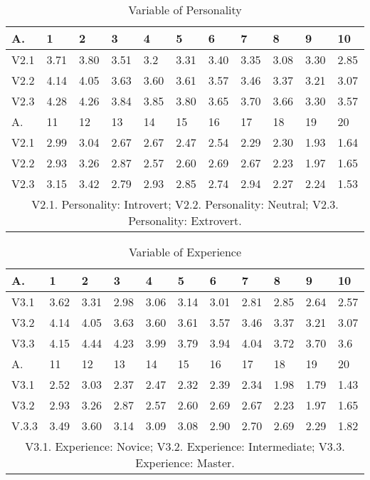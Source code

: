 \documentclass[english]{textolivre}
\begin{document}
\begin{table}[htpb]
\caption{Variable of Personality}
\label{figure4}
\centering
\begin{tabular}{lllllllllll}
\toprule
A. & 1 & 2 & 3 & 4 & 5 & 6 & 7 & 8 & 9 & 10
\\ 
\midrule
V2.1 & 3.71 & 3.80 & 3.51 & 3.2 & 3.31 & 3.40 & 3.35 & 3.08 & 3.30 & 2.85
\\
V2.2 & 4.14 & 4.05 & 3.63 & 3.60 & 3.61 & 3.57 & 3.46 & 3.37 & 3.21 & 3.07
\\
V2.3 & 4.28 & 4.26 & 3.84 & 3.85 & 3.80 & 3.65 & 3.70 & 3.66 & 3.30 & 3.57
\\
\midrule
A. & 11 & 12 & 13 & 14 & 15 & 16 & 17 & 18 & 19 & 20
\\
\midrule
V2.1 & 2.99 & 3.04 & 2.67 & 2.67 & 2.47 & 2.54 & 2.29 & 2.30 & 1.93 & 1.64
\\
V2.2 & 2.93 & 3.26 & 2.87 & 2.57 & 2.60 & 2.69 & 2.67 & 2.23 & 1.97 & 1.65
\\
V2.3 & 3.15 & 3.42 & 2.79 & 2.93 & 2.85 & 2.74 & 2.94 & 2.27 & 2.24 & 1.53
\\ 
\midrule
\multicolumn{11}{c}{V2.1. Personality: Introvert; V2.2. Personality: Neutral; V2.3. Personality: Extrovert.}
\\
\bottomrule
\end{tabular}
\centering
\end{table}

\begin{table}[htpb]
\caption{Variable of Experience}
\label{figure5}
\centering
\begin{tabular}{lllllllllll}
\toprule
A. & 1 & 2 & 3 & 4 & 5 & 6 & 7 & 8 & 9 & 10
\\ 
\midrule
V3.1 & 3.62 & 3.31 & 2.98 & 3.06 & 3.14 & 3.01 & 2.81 & 2.85 & 2.64 & 2.57 
\\
V3.2 & 4.14 & 4.05 & 3.63 & 3.60 & 3.61 & 3.57 & 3.46 & 3.37 & 3.21 & 3.07
\\
V3.3 & 4.15 & 4.44 & 4.23 & 3.99 & 3.79 & 3.94 & 4.04 & 3.72 & 3.70 & 3.6
\\
\midrule
A. & 11 & 12 & 13 & 14 & 15 & 16 & 17 & 18 & 19 & 20
\\
\midrule
V3.1 & 2.52 & 3.03 & 2.37 & 2.47 & 2.32 & 2.39 & 2.34 & 1.98 & 1.79 & 1.43
\\
V3.2 & 2.93 & 3.26 & 2.87 & 2.57 & 2.60 & 2.69 & 2.67 & 2.23 & 1.97 & 1.65
\\
V.3.3 & 3.49 & 3.60 & 3.14 & 3.09 & 3.08 & 2.90 & 2.70 & 2.69 & 2.29 & 1.82
\\ 
\midrule
\multicolumn{11}{c}{V3.1. Experience: Novice; V3.2. Experience: Intermediate; V3.3. Experience: Master.}
\\
\bottomrule
\end{tabular}
\end{table}
\end{document}
